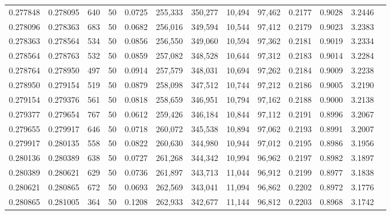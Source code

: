 \begin{tabular}{rrrrrrrrrrrrr}
0.277848 & 0.278095 &   640 &  50 &                                     0.0725 & 255,333 & 350,277 &  10,494 &  97,462 & 0.2177 & 0.9028 & 3.2446 \\
0.278096 & 0.278363 &   683 &  50 &                                     0.0682 & 256,016 & 349,594 &  10,544 &  97,412 & 0.2179 & 0.9023 & 3.2383 \\
0.278363 & 0.278564 &   534 &  50 &                                     0.0856 & 256,550 & 349,060 &  10,594 &  97,362 & 0.2181 & 0.9019 & 3.2334 \\
0.278564 & 0.278763 &   532 &  50 &                                     0.0859 & 257,082 & 348,528 &  10,644 &  97,312 & 0.2183 & 0.9014 & 3.2284 \\
0.278764 & 0.278950 &   497 &  50 &                                     0.0914 & 257,579 & 348,031 &  10,694 &  97,262 & 0.2184 & 0.9009 & 3.2238 \\
0.278950 & 0.279154 &   519 &  50 &                                     0.0879 & 258,098 & 347,512 &  10,744 &  97,212 & 0.2186 & 0.9005 & 3.2190 \\
0.279154 & 0.279376 &   561 &  50 &                                     0.0818 & 258,659 & 346,951 &  10,794 &  97,162 & 0.2188 & 0.9000 & 3.2138 \\
0.279377 & 0.279654 &   767 &  50 &                                     0.0612 & 259,426 & 346,184 &  10,844 &  97,112 & 0.2191 & 0.8996 & 3.2067 \\
0.279655 & 0.279917 &   646 &  50 &                                     0.0718 & 260,072 & 345,538 &  10,894 &  97,062 & 0.2193 & 0.8991 & 3.2007 \\
0.279917 & 0.280135 &   558 &  50 &                                     0.0822 & 260,630 & 344,980 &  10,944 &  97,012 & 0.2195 & 0.8986 & 3.1956 \\
0.280136 & 0.280389 &   638 &  50 &                                     0.0727 & 261,268 & 344,342 &  10,994 &  96,962 & 0.2197 & 0.8982 & 3.1897 \\
0.280389 & 0.280621 &   629 &  50 &                                     0.0736 & 261,897 & 343,713 &  11,044 &  96,912 & 0.2199 & 0.8977 & 3.1838 \\
0.280621 & 0.280865 &   672 &  50 &                                     0.0693 & 262,569 & 343,041 &  11,094 &  96,862 & 0.2202 & 0.8972 & 3.1776 \\
0.280865 & 0.281005 &   364 &  50 &                                     0.1208 & 262,933 & 342,677 &  11,144 &  96,812 & 0.2203 & 0.8968 & 3.1742 \\

\end{tabular}
